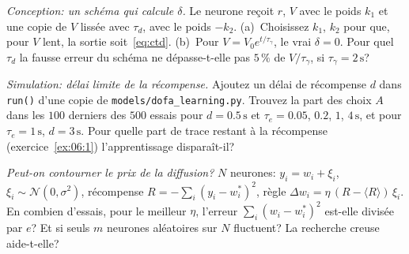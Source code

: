 \begin{exercise}[\lvlB]
\label{ex:06:6}
\emph{Conception: un schéma qui calcule $\delta$.} Le neurone  reçoit $r$, $V$ avec le poids $k_1$ et une copie de $V$ lissée avec $\tau_d$, avec le poids $-k_2$. (a)~Choisissez $k_1$, $k_2$ pour que, pour $V$ lent, la sortie soit~\eqref{eq:ctd}. (b)~Pour $V=V_0e^{t/\tau_\gamma}$, le vrai $\delta=0$. Pour quel $\tau_d$ la fausse erreur du schéma ne dépasse-t-elle pas $5\,\%$ de $V/\tau_\gamma$, si $\tau_\gamma=2\,\text{s}$?
\end{exercise}

\begin{exercise}[\lvlB]
\label{ex:06:7}
\emph{Simulation: délai limite de la récompense.} Ajoutez un délai de récompense $d$ dans \texttt{run()} d'une copie de \texttt{models/\allowbreak dofa\_learning.py}. Trouvez la part des choix $A$ dans les $100$ derniers des $500$ essais pour $d=0.5\,\text{s}$ et $\tau_e=0.05$, $0.2$, $1$, $4\,\text{s}$, et pour $\tau_e=1\,\text{s}$, $d=3\,\text{s}$. Pour quelle part de trace restant à la récompense (exercice~\ref{ex:06:1}) l'apprentissage disparaît-il?
\end{exercise}

\begin{exercise}[\lvlC]
\label{ex:06:8}
\emph{Peut-on contourner le prix de la diffusion?} $N$ neurones: $y_i=w_i+\xi_i$, $\xi_i\sim\mathcal N(0,\sigma^2)$, récompense $R=-\sum_i(y_i-w_i^*)^2$, règle $\Delta w_i=\eta\,(R-\langle R\rangle)\,\xi_i$. En combien d'essais, pour le meilleur $\eta$, l'erreur $\sum_i(w_i-w_i^*)^2$ est-elle divisée par $e$? Et si seuls $m$ neurones aléatoires sur $N$ fluctuent? La recherche creuse aide-t-elle?
\end{exercise}

